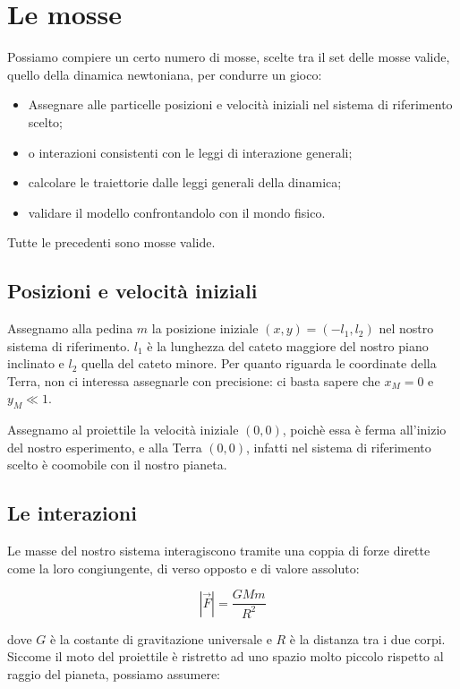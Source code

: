 \documentclass{article}
\begin{document}
\section{Le mosse}
Possiamo compiere un certo numero di mosse, scelte tra il set
delle mosse valide, quello della dinamica newtoniana, per
condurre un gioco:

\begin{itemize}
\item Assegnare alle particelle posizioni e velocità iniziali nel sistema di riferimento scelto;
\item o interazioni consistenti con le leggi di interazione generali;
\item calcolare le traiettorie dalle leggi generali della dinamica;
\item validare il modello confrontandolo con il mondo fisico.
\end{itemize}

Tutte le precedenti sono mosse valide.

\subsection{Posizioni e velocità iniziali}
Assegnamo alla pedina $m$ la posizione iniziale $(x,y) = (-l_1,l_2)$ nel nostro
sistema di riferimento.
$l_1$ è la lunghezza del cateto maggiore del nostro piano inclinato e $l_2$
quella del cateto minore.
Per quanto riguarda le coordinate della
Terra, non ci interessa assegnarle con precisione: ci basta sapere
che $x_M = 0$ e $y_M \ll 1$.

Assegnamo al proiettile la velocità iniziale $(0,0)$, poichè essa è ferma
all'inizio del nostro esperimento, e alla Terra $(0,0)$, infatti
nel sistema di riferimento scelto è coomobile con il nostro pianeta.

\subsection{Le interazioni}
Le masse del nostro sistema interagiscono tramite una coppia di forze dirette
come la loro congiungente, di verso opposto e di valore assoluto:

\begin{equation}
|\vec{F}| = \frac{G M m}{R^2}
\end{equation}

dove $G$ è la costante di gravitazione universale e $R$ è la distanza tra i due
corpi. Siccome il moto del proiettile è ristretto ad uno spazio
molto piccolo rispetto al raggio del pianeta, possiamo assumere:
\end{document}
